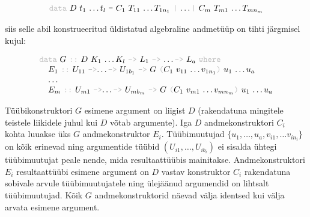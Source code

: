 \documentclass[12pt]{article}
\begin{document}
        \begin{equation*}
          \begin{tabular}{l}
            {\color{helehall}\verb!data!} $D$ $t_1$ \ldots $t_l$ {\color{helehall}\verb!=!} $C_1$ $T_{11}$ \ldots $T_{1n_1}$ {\color{helehall}\verb!|!} \ldots {\color{helehall}\verb!|!} $C_m$ $T_{m1}$ \ldots $T_{mn_m}$
          \end{tabular}
        \end{equation*}

        siis selle abil konstrueeritud üldistatud algebraline andmetüüp on tihti järgmisel kujul:

        \begin{equation*}
          \begin{tabular}{l}
            {\color{helehall}\verb!data!} $G$ {\color{helehall}\verb!::!} $D$ $K_1$ \ldots $K_l$ {\color{helehall}\verb!->!} $L_1$ {\color{helehall}\verb!->!} \ldots {\color{helehall}\verb!->!} $L_a$ {\color{helehall}\verb!where!} \\
            \verb!  !$E_1$ {\color{helehall}\verb!::!} $U_{11}$ {\color{helehall}\verb!->!}\ldots {\color{helehall}\verb!->!} $U_{1b_1}$ {\color{helehall}\verb!->!} $G$ {\color{helehall}\verb!(!}$C_1$ $v_{11}$ \ldots $v_{1n_1}${\color{helehall}\verb!)!} $u_1$ \ldots $u_a$ \\
            \verb!  !\ldots \\
            \verb!  !$E_m$ {\color{helehall}\verb!::!} $U_{m1}$ {\color{helehall}\verb!->!}\ldots {\color{helehall}\verb!->!} $U_{mb_m}$ {\color{helehall}\verb!->!} $G$ {\color{helehall}\verb!(!}$C_1$ $v_{m1}$ \ldots $v_{mn_m}${\color{helehall}\verb!)!} $u_1$ \ldots $u_a$
          \end{tabular}
        \end{equation*}

        Tüübikonstruktori $G$ esimene argument on liigist $D$ (rakendatuna mingitele teistele liikidele juhul kui $D$ võtab argumente). Iga $D$ andmekonstruktori $C_i$ kohta luuakse üks $G$ andmekonstruktor $E_i$. Tüübimuutujad $\{u_1,\ldots,u_a,v_{i1},\ldots v_{in_i}\}$ on kõik erinevad ning argumentide tüübid $(U_{i1},\ldots,U_{ib_i})$ ei sisalda ühtegi tüübimuutujat peale nende, mida resultaattüübis mainitakse. Andmekonstruktori $E_i$ resultaattüübi esimene argument on $D$ vastav konstruktor $C_i$ rakendatuna sobivale arvule tüübimuutujatele ning ülejäänud argumendid on lihtsalt tüübimuutujad. Kõik $G$ andmekonstruktorid näevad välja identsed kui välja arvata esimene argument.
\end{document}
